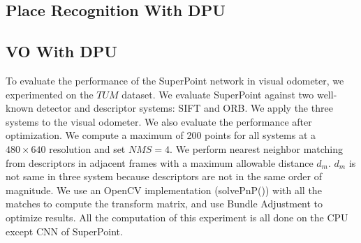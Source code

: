 


\subsection{ Place Recognition With DPU }



\subsection{ VO With DPU }

To evaluate the performance of the SuperPoint network in visual odometer, we experimented on the $TUM$ dataset. We evaluate SuperPoint against two well-known detector and descriptor systems: SIFT\cite{Lowe-478} and ORB\cite{RubleeRabaud-479}. We apply the three systems to the visual odometer. We also evaluate the performance after optimization. We compute a maximum of 200 points for all systems at a $480\times640$ resolution and set $NMS=4$. We perform nearest neighbor matching from descriptors in adjacent frames with a maximum allowable distance $d_m$. $d_m$ is not same in three system because descriptors are not in the same order of magnitude. We use an OpenCV implementation (solvePnP()) with all the matches to compute the transform matrix, and use Bundle Adjustment to optimize results. All the computation of this experiment is all done on the CPU except CNN of SuperPoint. 

